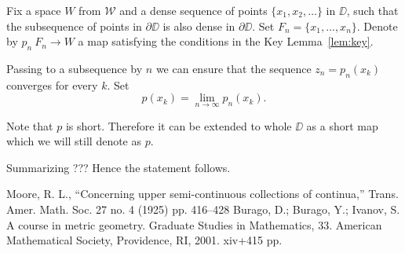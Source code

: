 \documentclass[a4paper,10pt]{amsart}
\begin{document}
Fix a space $W$ from $\mathcal{W}$
and a dense sequence of points $\{x_1,x_2,\dots\}$ in $\DD$,
such that the subsequence of points in $\partial \DD$
is also dense in $\partial \DD$.
Set $F_n=\{x_1,\dots,x_n\}$.
Denote by $p_n\:F_n\to W$ a map satisfying the conditions in the Key Lemma~\ref{lem:key}.

Passing to a subsequence by $n$ we can ensure that the sequence
$z_n=p_n(x_k)$ converges for every $k$.
Set 
\[p(x_k)=\lim_{n\to\infty} p_n(x_k).\]

Note that $p$ is short. 
Therefore it can be extended to whole $\DD$ as a short map which we will still denote as $p$.

Summarizing ??? Hence the statement follows.\qeds


\begin{thebibliography}{52}
Moore, R. L.,
``Concerning upper semi-continuous collections of continua,''
Trans. Amer. Math. Soc. 27 no. 4 (1925) pp. 416--428
Burago, D.; Burago, Y.; Ivanov, S.
A course in metric geometry.
Graduate Studies in Mathematics, 33. American Mathematical Society, Providence, RI, 2001. xiv+415 pp.
\end{thebibliography}
\end{document}
